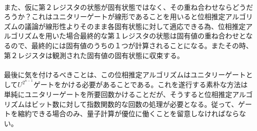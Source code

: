 \documentclass[a4paper,10.5pt]{article}
\numberwithin{equation}{section}
\begin{document}
\\
また、仮に第２レジスタの状態が固有状態ではなく、その重ね合わせならどうだろうか？これはユニタリーゲートが線形であることを用いると位相推定アルゴリズムの議論が線形性よりそのまま各固有状態に対して適応できる為、位相推定アルゴリズムを用いた場合最終的な第１レジスタの状態は固有値の重ね合わせとなるので、最終的には固有値のうちの１つが計算されることになる。またその時、第２レジスタは観測された固有値の固有状態に収束する。\\
\\
最後に気を付けるべきことは、この位相推定アルゴリズムはユニタリーゲートとして$U^{2^{n-1}}$ゲートをかける必要があることである。これを遂行する素朴な方法は単純にユニタリーゲートを所要回数かけることだが、そうすると位相推定アルゴリズムはビット数に対して指数関数的な回数の処理が必要となる。従って、ゲートを縮約できる場合のみ、量子計算が優位に働くことを留意しなければならない。\\
\end{document}

